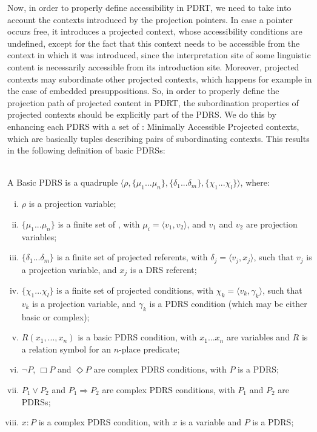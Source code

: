 Now, in order to properly define accessibility in PDRT, we need to take into
account the contexts introduced by the projection pointers.  In case
a pointer occurs free, it introduces a projected context, whose
accessibility conditions are undefined, except for the fact that this
context needs to be accessible from the context in which it was introduced,
since the interpretation site of some linguistic content is necessarily
accessible from its introduction site. Moreover, projected contexts may
subordinate other projected contexts, which happens for example in the case
of embedded presuppositions. So, in order to properly define the projection
path of projected content in PDRT, the subordination properties of projected
contexts should be explicitly part of the PDRS. We do this by enhancing each
PDRS with a set of \MAPs: Minimally Accessible Projected contexts, which are
basically tuples describing pairs of  subordinating contexts. This results
in the following definition of basic PDRSs:

\begin{definition} \label{def:bPDRS}~\\
A Basic PDRS is a quadruple $\langle \rho, \{\mu_1 ... \mu_n\}, 
\{\delta_1 ... \delta_m\}, \{\chi_1 ... \chi_l\}\rangle$, where:
  \begin{enumerate}[i.]
    \item $\rho$ is a projection variable;
    \item $\{\mu_1 ... \mu_n\}$ is a finite set of \MAPs, with $\mu_i=\langle
      v_1,v_2\rangle$, and  $v_1$ and $v_2$ are projection variables;
    \item $\{\delta_1 ... \delta_m\}$ is a finite set of projected
      referents, with $\delta_j=\langle v_j, x_j\rangle$, such that $v_j$ is
      a projection variable, and $x_j$ is a DRS referent;
    \item $\{\chi_1 ... \chi_l\}$ is a finite set of projected conditions,
      with $\chi_k = \langle v_k,\gamma_k\rangle$, such that $v_k$ is a
      projection variable, and $\gamma_k$ is a PDRS condition (which may be
      either basic or complex);
    \item \label{def:bPDRS:Rel} $R(x_1, ..., x_n)$ is a basic PDRS condition,
      with $x_1 ... x_n$ are variables and $R$ is a relation symbol for an
      $n$-place predicate;
    \item $\neg P$, $\Box P$ and $\Diamond P$ are complex PDRS conditions,
      with $P$ is a PDRS;
    \item $P_1 \vee P_2$ and $P_1 \Rightarrow P_2$ are complex PDRS
      conditions, with $P_1$ and $P_2$ are PDRSs;
    \item\label{def:bPDRS:Prop} $x:P$ is a complex PDRS condition, with $x$
      is a variable and $P$ is a PDRS;
  \end{enumerate}
\end{definition}

